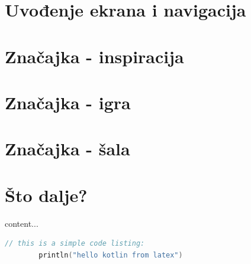 \documentclass[11pt,a4paper,twoside]{article}
\begin{document}
\section{Uvođenje ekrana i navigacija}
\section{Značajka - inspiracija}
\section{Značajka - igra}
\section{Značajka - šala}
\section{Što dalje?}

	
	
	content...
	\begin{lstlisting}[caption={Simple code listing.}, label={lst:example1}, language=Kotlin]
		// this is a simple code listing:
		println("hello kotlin from latex")
	\end{lstlisting}
\end{document}
